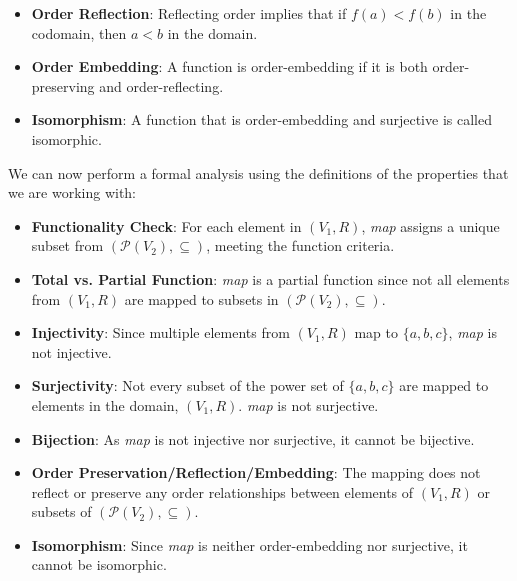 \documentclass[12pt]{article}
\begin{document}
\begin{spacing}{1.5}
\begin{itemize}
		\item \textbf{Order Reflection}: Reflecting order implies that if $f(a) < f(b)$ in the codomain, then $a < b$ in the domain.
		      		          
		\item \textbf{Order Embedding}: A function is order-embedding if it is both order-preserving and order-reflecting.
		      		          
		\item \textbf{Isomorphism}: A function that is order-embedding and surjective is called isomorphic. 
	\end{itemize}
		
	\noindent We can now perform a formal analysis using the definitions of the properties that we are working with:
		
	\begin{itemize}
		\item \textbf{Functionality Check}: For each element in $(V_1, R)$, \textit{map} assigns a unique subset from $(\mathcal{P}(V_2), \subseteq)$, meeting the function criteria.
		      		      
		\item \textbf{Total vs. Partial Function}: \textit{map} is a partial function since not all elements from $(V_1, R)$ are mapped to subsets in $(\mathcal{P}(V_2), \subseteq)$.
		      		      
		\item \textbf{Injectivity}: Since multiple elements from $(V_1, R)$ map to $\{a,b,c\}$, \textit{map} is not injective.
		      		      
		\item \textbf{Surjectivity}: Not every subset of the power set of $\{a,b,c\}$ are mapped to elements in the domain, $(V_1,R)$. \textit{map} is not surjective.
		      		      
		\item \textbf{Bijection}: As \textit{map} is not injective nor surjective, it cannot be bijective.
		      		      
		\item \textbf{Order Preservation/Reflection/Embedding}: The mapping does not reflect or preserve any order relationships between elements of $(V_1, R)$ or subsets of $(\mathcal{P}(V_2), \subseteq)$.
		      		      
		\item \textbf{Isomorphism}: Since \textit{map} is neither order-embedding nor surjective, it cannot be isomorphic.
	\end{itemize}
		

\end{spacing}
\end{document}
